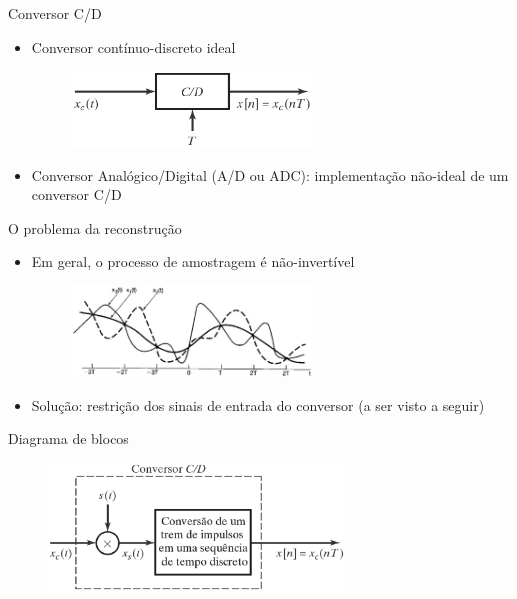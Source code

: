 \begin{slide}{Conversor C/D}
\begin{itemize}
   \item Conversor cont\'inuo-discreto ideal
   \begin{figure}
      \centering
      \includegraphics[width=0.6\textwidth]{figs/cdideal2.eps}
   \end{figure}
   \item Conversor Anal\'ogico/Digital (A/D ou ADC): implementa\c c\~ao n\~ao-ideal de um conversor C/D
\end{itemize}
\end{slide}

\begin{slide}{O problema da reconstrução}
\begin{itemize}
   \item Em geral, o processo de amostragem \'e n\~ao-invert\'ivel
   \begin{figure}
      \centering
      \includegraphics[width=0.6\textwidth]{figs/ambiguo.eps}
   \end{figure}
   \item Solu\c c\~ao: restri\c c\~ao dos sinais de entrada do conversor (a ser visto a seguir)
\end{itemize}
\end{slide}

\begin{slide}{Diagrama de blocos}
   \begin{figure}
      \centering
      \includegraphics[width=0.7\textwidth]{figs/cd_implem.eps}
   \end{figure}
\end{slide}

